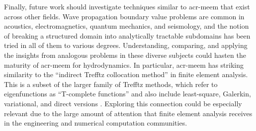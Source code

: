 \documentclass[lineno]{JFM-FLM_Au}
\begin{document}
Finally, future work should investigate techniques similar to \gls{acr-meem} that exist across other fields.
Wave propagation boundary value problems are common in acoustics, electromagnetics, quantum mechanics, and seismology, 
and the notion of breaking a structured domain into analytically tractable subdomains has been tried in all of them to various degrees.
Understanding, comparing, and applying the insights from analogous problems in these diverse subjects could hasten the maturity of \gls{acr-meem} for hydrodynamics.
In particular, \gls{acr-meem} has striking similarity to the ``indirect Trefftz collocation method'' in finite element analysis.
This is a subset of the larger family of Trefftz methods, which refer to eigenfunctions as ``T-complete functions'' and also include least-square, Galerkin, variational, and direct versions \citep{kita_trefftz_1995}.
Exploring this connection could be especially relevant due to the large amount of attention that finite element analysis receives in the engineering and numerical computation communities.
\end{document}
